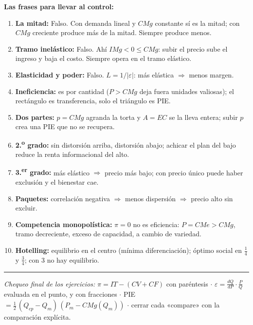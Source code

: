 \documentclass[11pt]{article}
\begin{document}
\textbf{Las frases para llevar al control:}
\begin{enumerate}[leftmargin=*,itemsep=3pt]
\item \textbf{La mitad:} Falso. Con demanda lineal y $CMg$ constante sí es la mitad; con $CMg$ creciente produce más de la mitad. Siempre produce menos.
\item \textbf{Tramo inelástico:} Falso. Ahí $IMg < 0 \leq CMg$: subir el precio sube el ingreso y baja el costo. Siempre opera en el tramo elástico.
\item \textbf{Elasticidad y poder:} Falso. $L = 1/|\varepsilon|$: más elástica $\Rightarrow$ menos margen.
\item \textbf{Ineficiencia:} es por cantidad ($P > CMg$ deja fuera unidades valiosas); el rectángulo es transferencia, solo el triángulo es PIE.
\item \textbf{Dos partes:} $p = CMg$ agranda la torta y $A = EC$ se la lleva entera; subir $p$ crea una PIE que no se recupera.
\item \textbf{2.\textsuperscript{o} grado:} sin distorsión arriba, distorsión abajo; achicar el plan del bajo reduce la renta informacional del alto.
\item \textbf{3.\textsuperscript{er} grado:} más elástico $\Rightarrow$ precio más bajo; con precio único puede haber exclusión y el bienestar cae.
\item \textbf{Paquetes:} correlación negativa $\Rightarrow$ menos dispersión $\Rightarrow$ precio alto sin excluir.
\item \textbf{Competencia monopolística:} $\pi = 0$ no es eficiencia: $P = CMe > CMg$, tramo decreciente, exceso de capacidad, a cambio de variedad.
\item \textbf{Hotelling:} equilibrio en el centro (mínima diferenciación); óptimo social en $\tfrac14$ y $\tfrac34$; con 3 no hay equilibrio.
\end{enumerate}

\medskip
\hrule
\smallskip
{\small\textit{Chequeo final de los ejercicios:} $\pi = IT - (CV + CF)$ con paréntesis $\cdot$ $\varepsilon = \tfrac{dQ}{dP}\cdot\tfrac{P}{Q}$ evaluada en el punto, y con fracciones $\cdot$ PIE $= \tfrac12\,(Q_{cp} - Q_m)\,(P_m - CMg(Q_m))$ $\cdot$ cerrar cada «compare» con la comparación explícita.}
\end{document}
